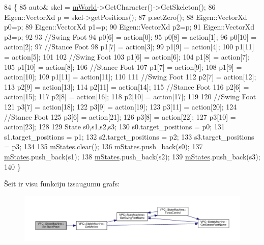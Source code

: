 \begin{DoxyCode}
84                                   \{
85     \textcolor{keyword}{auto}& skel = \hyperlink{class_v_p_c_1_1_state_machine_a50cdee7e7d9a0824f067d0bf1b312c32}{mWorld}->GetCharacter()->GetSkeleton();
86     Eigen::VectorXd p = skel->getPositions();
87     p.setZero();
88     Eigen::VectorXd p0=p;
89     Eigen::VectorXd p1=p;
90     Eigen::VectorXd p2=p;
91     Eigen::VectorXd p3=p;
92 
93     \textcolor{comment}{//Swing Foot}
94     p0[6] = action[0];
95     p0[8] = action[1];
96     p0[10] = action[2];
97     \textcolor{comment}{//Stance Foot}
98     p1[7] = action[3];
99     p1[9] = action[4];
100     p1[11] = action[5];
101 
102     \textcolor{comment}{//Swing Foot}
103     p1[6] = action[6];
104     p1[8] = action[7];
105     p1[10] = action[8];
106     \textcolor{comment}{//Stance Foot}
107     p1[7] = action[9];
108     p1[9] = action[10];
109     p1[11] = action[11];
110 
111     \textcolor{comment}{//Swing Foot}
112     p2[7] = action[12];
113     p2[9] = action[13];
114     p2[11] = action[14];
115     \textcolor{comment}{//Stance Foot}
116     p2[6] = action[15];
117     p2[8] = action[16];
118     p2[10] = action[17];
119 
120     \textcolor{comment}{//Swing Foot}
121     p3[7] = action[18];
122     p3[9] = action[19];
123     p3[11] = action[20];
124     \textcolor{comment}{//Stance Foot}
125     p3[6] = action[21];
126     p3[8] = action[22];
127     p3[10] = action[23];
128 
129     State s0,s1,s2,s3;
130     s0.target\_positions = p0;
131     s1.target\_positions = p1;
132     s2.target\_positions = p2;
133     s3.target\_positions = p3;
134 
135     \hyperlink{class_v_p_c_1_1_state_machine_a31a1498d9a99c4f7b60ec326b002d514}{mStates}.clear();
136     \hyperlink{class_v_p_c_1_1_state_machine_a31a1498d9a99c4f7b60ec326b002d514}{mStates}.push\_back(s0);
137     \hyperlink{class_v_p_c_1_1_state_machine_a31a1498d9a99c4f7b60ec326b002d514}{mStates}.push\_back(s1);
138     \hyperlink{class_v_p_c_1_1_state_machine_a31a1498d9a99c4f7b60ec326b002d514}{mStates}.push\_back(s2);
139     \hyperlink{class_v_p_c_1_1_state_machine_a31a1498d9a99c4f7b60ec326b002d514}{mStates}.push\_back(s3);
140 \}
\end{DoxyCode}


Šeit ir visu funkciju izsaugumu grafs\+:
\nopagebreak
\begin{figure}[H]
\begin{center}
\leavevmode
\includegraphics[width=350pt]{class_v_p_c_1_1_state_machine_af1b80fe57cbacfe9b2cb29ef8a0a29ff_cgraph}
\end{center}
\end{figure}




